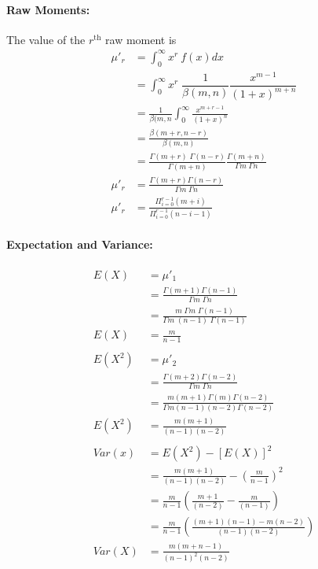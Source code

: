 \documentclass[
10pt, %
a4paper, %
]{report}
\begin{document}
\paragraph{Raw Moments:}
The value of the \(r^{\text{th}}\) raw moment is
\begin{align*}
    \mu'_r &= \int_0^\infty x^r\:f(x)dx \\
           &= \int_0^\infty x^r\;\dfrac{1}{\beta(m, n)}\dfrac{x^{m-1}}{(1+x)^{m+n}} \\
           &= \frac{1}{\beta(m, n} \int_0^\infty \frac{x^{m+r-1}}{(1+x)^{n}} \\
           &= \frac{\beta(m+r, n-r)}{\beta(m, n)} \\
           &= \frac{\Gamma (m+r) \; \Gamma (n-r)}{\Gamma (m+n)} \frac{\Gamma (m+n)}{\Gamma m \; \Gamma n} \\
    \mu'_r &= \frac{\Gamma (m+r) \Gamma (n-r)}{\Gamma m \; \Gamma n} \\
    \mu'_r &= \frac{\Pi_{i=0}^{r-1}(m+i)}{\Pi_{i=0}^{r-1}(n-i-1)} 
\end{align*}

\paragraph{Expectation and Variance:}
\begin{align*}
    E(X) &= \mu'_1 \\
         &= \frac{\Gamma (m+1) \Gamma (n-1)}{\Gamma m \; \Gamma n} \\
         &= \frac{m \;\Gamma m \;\Gamma (n-1)}{\Gamma m \;(n-1) \; \Gamma (n-1)} \\
    E(X) &= \frac{m}{n-1} \\ \\
    E(X^2) &= \mu'_2 \\
           &= \frac{\Gamma (m+2) \Gamma (n-2)}{\Gamma m \; \Gamma n} \\
         &= \frac{m(m+1) \Gamma (m) \Gamma (n-2)}{\Gamma m (n-1)(n-2) \Gamma (n-2)} \\ 
    E(X^2) &= \frac{m(m+1)}{(n-1)(n-2)}  \\ \\
    Var(x) &= E(X^2) - [E(X)]^2 \\
           &= \frac{m(m+1)}{(n-1)(n-2)} - \left(\frac{m}{n-1}\right)^2 \\
           &= \frac{m}{n-1} \left( \frac{m+1}{(n-2)} - \frac{m}{(n-1)}\right) \\
           &= \frac{m}{n-1} \left( \frac{(m+1)(n-1) - m(n-2)}{(n-1)(n-2)}\right) \\
    Var(X) &= \frac{m(m+n-1)}{(n-1)^2(n-2)}
\end{align*}
\end{document}
